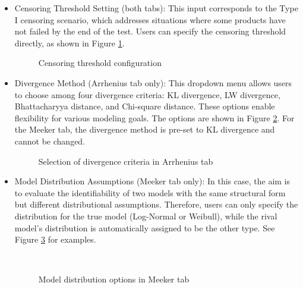 \begin{itemize}

\item Censoring Threshold Setting (both tabs): This input corresponds to the Type I censoring scenario, which addresses situations where some products have not failed by the end of the test. Users can specify the censoring threshold directly, as shown in Figure \ref{fig:Arrhenius-shiny2}.

\begin{figure}[H]
    \caption{Censoring threshold configuration}
    \label{fig:Arrhenius-shiny2}
\end{figure}

\item Divergence Method (Arrhenius tab only): This dropdown menu allows users to choose among four divergence criteria: KL divergence, LW divergence, Bhattacharyya distance, and Chi-square distance. These options enable flexibility for various modeling goals. The options are shown in Figure \ref{fig:Arrhenius-shiny1}. For the Meeker tab, the divergence method is pre-set to KL divergence and cannot be changed.

\begin{figure}[H]
    \caption{Selection of divergence criteria in Arrhenius tab}
    \label{fig:Arrhenius-shiny1}
\end{figure}

\item Model Distribution Assumptions (Meeker tab only): In this case, the aim is to evaluate the identifiability of two models with the same structural form but different distributional assumptions. Therefore, users can only specify the distribution for the true model (Log-Normal or Weibull), while the rival model's distribution is automatically assigned to be the other type. See Figure \ref{fig:Meeker-shiny} for examples.

\begin{figure}[H]
\centering
{}\\
\caption{Model distribution options in Meeker tab}
\label{fig:Meeker-shiny}
\end{figure}

\end{itemize}


